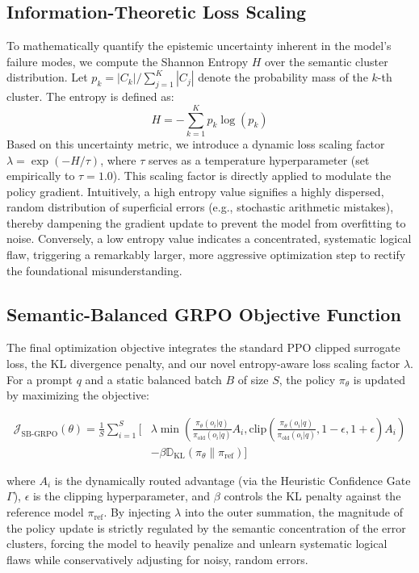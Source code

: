 \subsection{Information-Theoretic Loss Scaling}\label{subsec:info-theoretic-loss}
To mathematically quantify the epistemic uncertainty inherent in the model's failure modes, we compute the Shannon Entropy $H$ over the semantic cluster distribution. Let $p_k = |C_k| / \sum_{j=1}^K |C_j|$ denote the probability mass of the $k$-th cluster. The entropy is defined as:
\begin{equation}
H = - \sum_{k=1}^K p_k \log(p_k)
\end{equation}
Based on this uncertainty metric, we introduce a dynamic loss scaling factor $\lambda = \exp(-H/\tau)$, where $\tau$ serves as a temperature hyperparameter (set empirically to $\tau=1.0$). This scaling factor is directly applied to modulate the policy gradient. Intuitively, a high entropy value signifies a highly dispersed, random distribution of superficial errors (e.g., stochastic arithmetic mistakes), thereby dampening the gradient update to prevent the model from overfitting to noise. Conversely, a low entropy value indicates a concentrated, systematic logical flaw, triggering a remarkably larger, more aggressive optimization step to rectify the foundational misunderstanding.

\subsection{Semantic-Balanced GRPO Objective Function}
The final optimization objective integrates the standard PPO clipped surrogate loss, the KL divergence penalty, and our novel entropy-aware loss scaling factor $\lambda$. For a prompt $q$ and a static balanced batch $B$ of size $S$, the policy $\pi_\theta$ is updated by maximizing the objective:

\begin{equation}
\begin{aligned}
\mathcal{J}_{\text{SB-GRPO}}(\theta) = \frac{1}{S} \sum_{i=1}^{S} \Bigg[ &\lambda \min \left( \frac{\pi_\theta(o_i|q)}{\pi_{\text{old}}(o_i|q)} A_i, \text{clip}\left(\frac{\pi_\theta(o_i|q)}{\pi_{\text{old}}(o_i|q)}, 1-\epsilon, 1+\epsilon\right) A_i \right) \\
&- \beta \mathbb{D}_{\text{KL}}(\pi_\theta \| \pi_{\text{ref}}) \Bigg]
\end{aligned}
\end{equation}

where $A_i$ is the dynamically routed advantage (via the Heuristic Confidence Gate $\Gamma$), $\epsilon$ is the clipping hyperparameter, and $\beta$ controls the KL penalty against the reference model $\pi_{\text{ref}}$. By injecting $\lambda$ into the outer summation, the magnitude of the policy update is strictly regulated by the semantic concentration of the error clusters, forcing the model to heavily penalize and unlearn systematic logical flaws while conservatively adjusting for noisy, random errors.

